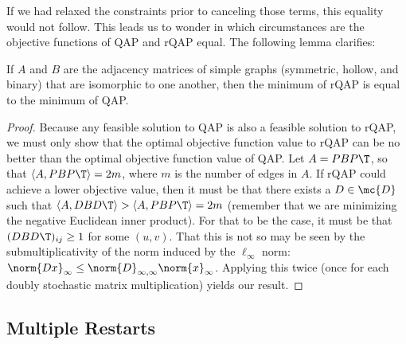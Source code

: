 \documentclass[11pt]{article}
\begin{document}
If we had relaxed the constraints prior to canceling those terms, this equality would not follow.  This leads us to wonder in which circumstances are the objective functions of QAP and rQAP equal.  The following lemma clarifies:
\begin{lem}
	If $A$ and $B$ are the adjacency matrices of simple graphs (symmetric, hollow, and binary) that are isomorphic to one another, then the minimum of rQAP is equal to the minimum of QAP.
\end{lem}
\begin{proof}
Because any feasible solution to QAP is also a feasible solution to rQAP, we must only show that the optimal objective function value to rQAP can be no better than the optimal objective function value of QAP.  Let $A=PBP\T$, so that $\langle A, PBP\T\rangle=2m$, where $m$ is the number of edges in $A$.  If rQAP could achieve a lower objective value, then it must be that there exists a $D \in \mc{D}$ such that $\langle A, DBD\T\rangle > \langle A, PBP\T\rangle = 2m$ (remember that we are minimizing the negative Euclidean inner product). For that to be the case, it must be that $(DBD\T)_{ij} \geq 1$ for some $(u,v)$.  That this is not so may be seen by the submultiplicativity of the norm induced by the $\ell_{\infty}$ norm:
$\norm{Dx}_\infty \leq \norm{D}_{\infty,\infty} \norm{x}_\infty$.  Applying this twice (once for each doubly stochastic matrix multiplication) yields our result.
\end{proof}







\subsection{Multiple Restarts} %
\label{sub:multiple_restarts}
\end{document}
